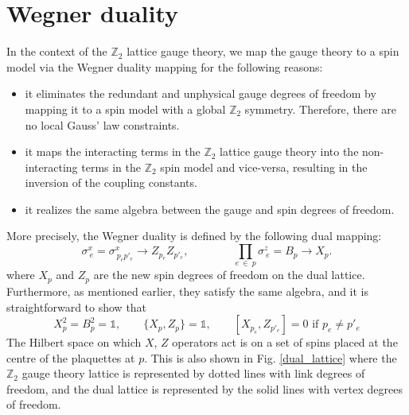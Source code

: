\documentclass[../thesis_main.tex]{subfiles}
\begin{document}
\section{Wegner duality}
In the context of the $\mathbb{Z}_2$ lattice gauge theory, we map the gauge theory to a spin model via the Wegner duality mapping for the following reasons:
\begin{itemize}
    \setlength{\itemsep}{0.1em}
    \item it eliminates the redundant and unphysical gauge degrees of freedom by mapping it to a spin model with a global $\mathbb{Z}_2$ symmetry. Therefore, there are no local Gauss' law constraints.
    \item it maps the interacting terms in the $\mathbb{Z}_2$ lattice gauge theory into the non-interacting terms in the $\mathbb{Z}_2$ spin model and vice-versa, resulting in the inversion of the coupling constants. 
    \item it realizes the same algebra between the gauge and spin degrees of freedom.
\end{itemize}
More precisely, the Wegner duality is defined by the following
dual mapping:
\begin{equation}
    \sigma^x_{\: e} = \sigma^x_{\: p_e p'_e} \longrightarrow Z_{p_e} Z_{p'_e}, \qquad\qquad \prod_{e \: \in \: p} \sigma^z_{\:e} = B_p \longrightarrow X_p.
\end{equation}
where $X_p$ and $Z_p$ are the new spin degrees of freedom on the dual lattice. Furthermore, as mentioned earlier, they satisfy the same algebra, and it is straightforward to show that
\begin{equation}
    X_p^2 = B_p^2 = \mathds{1}, \qquad \{X_p, Z_p\} = \mathds{1}, \qquad [X_{p_e}, Z_{p'_e}] = 0 \text{  if } p_e \neq p'_e   
\end{equation} 
The Hilbert space on which $X$, $Z$ operators act is on a set of spins placed at the centre of the plaquettes at $p$. This is also shown in Fig. \ref{dual_lattice} where the $\mathbb{Z}_2$ gauge theory lattice is represented by dotted lines with link degrees of freedom, and the dual lattice is represented by the solid lines with vertex degrees of freedom.
\end{document}
